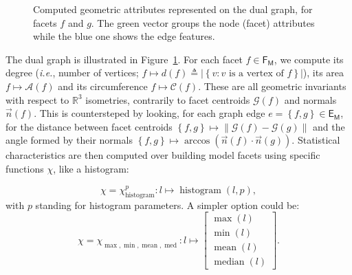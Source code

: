         \begin{figure}[htbp]
            \centering
            
            \caption{
                \label{fig::geometric_features}
                Computed geometric attributes represented on the dual graph, for facets $f$ and $g$.
                The green vector groups the node (facet) attributes while the blue one shows the edge features.
            }
        \end{figure}

        The dual graph is illustrated in Figure~\ref{fig::geometric_features}.
        For each facet $f \in \mathsf{F_M}$, we compute its degree (\textit{i.e.}, number of vertices; $f \mapsto d\left(f\right) \triangleq \left\lvert\left\{v : v\text{ is a vertex of }f\right\}\right\rvert$), its area $f \mapsto \mathscr{A}\left(f\right)$ and its circumference $f \mapsto \mathscr{C}\left(f\right)$.
        These are all geometric invariants with respect to $\mathbb{R}^3$ isometries, contrarily to facet centroids $\mathscr{G}\left(f\right)$ and normals $\vec{n}\left(f\right)$.
        This is countersteped by looking, for each graph edge $e=\left\{f, g\right\} \in \mathsf{E_M}$, for the distance between facet centroids $\left\{f, g\right\} \mapsto \left\lVert \mathscr{G}\left(f\right) - \mathscr{G}\left(g\right) \right\rVert$ and the angle formed by their normals $\left\{f, g\right\} \mapsto \arccos\left(\vec{n}\left(f\right) \cdot \vec{n}\left(g\right)\right)$.
        Statistical characteristics are then computed over building model facets using specific functions \(\chi\), like a histogram:        

        \begin{equation}
            \label{eq::histogram_extractor}
        	\chi = \chi^p_{\operatorname{histogram}}: l \mapsto \operatorname{histogram}(l, p),
        \end{equation}
        with $p$ standing for histogram parameters. A simpler option could be:
        \begin{equation}
            \label{eq::max_min_mean_med_extractor}
            \chi = \chi_{\max,\min,\operatorname{mean},\operatorname{med}}: l \mapsto \begin{bmatrix}
                \max(l)\\
                \min(l)\\
                \operatorname{mean}(l)\\
                \operatorname{median}(l)
            \end{bmatrix}.
        \end{equation}

